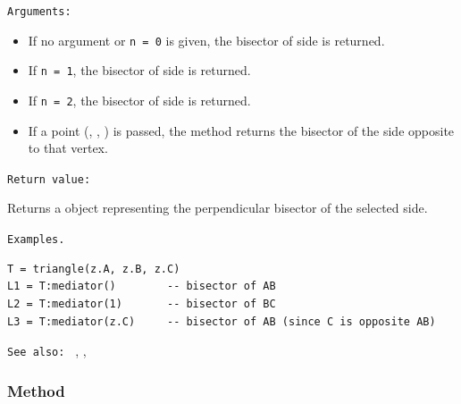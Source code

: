 \texttt{Arguments: }

\begin{itemize}
  \item If no argument or \texttt{n = 0} is given, the bisector of side  is returned.
  \item If \texttt{n = 1}, the bisector of side  is returned.
  \item If \texttt{n = 2}, the bisector of side  is returned.
  \item If a point (, , ) is passed, the method returns the bisector of the side opposite to that vertex.
\end{itemize}

\texttt{Return value: }

Returns a  object representing the perpendicular bisector of the selected side.

\texttt{Examples.}

\begin{mybox}
\begin{verbatim}
T = triangle(z.A, z.B, z.C)
L1 = T:mediator()        -- bisector of AB
L2 = T:mediator(1)       -- bisector of BC
L3 = T:mediator(z.C)     -- bisector of AB (since C is opposite AB)
\end{verbatim}
\end{mybox}


\begin{tkzexample}[latex=.55\textwidth]
\begin{center}
\end{center}
\end{tkzexample}


\texttt{See also: } , , 

\subsubsection{Method }
\label{antiparallel}

